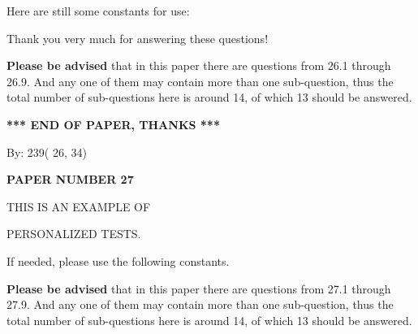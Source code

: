 \documentclass[12pt]{article}
\begin{document}
 
 
   
   
 \vspace{0.2in}
Here are still some constants for use:
 
 
 
 
Thank you very much for answering these questions!
 
{\textbf{\large{Please be advised}}} that in this paper there are questions from
26.1 through
26.9.
And any one of them may contain more than one sub-question, thus the total number
of sub-questions here is around 14, of which
13 should be answered.
 
   
   
   
   
\vspace{1.0in} 
{\textbf{\large{ *** END OF PAPER, THANKS *** }}} 
   
   
\hspace{1.0in} By: 
         239(         26,          34)
   
   
   
   
\newpage 
\setcounter{page}{ 
    27001 } 
   
   
   
   
 {\textbf{ \Large{ PAPER NUMBER          27 }}}
   
   
\vspace{0.2in}
   
   
   
   
   
   
 \vspace{0.2in}
 
 
{\Huge  THIS IS AN EXAMPLE OF}
 
{\Huge  PERSONALIZED TESTS. }
 
If needed, please use the following constants.
 
 
 
{\textbf{\large{Please be advised}}} that in this paper there are questions from
27.1 through
27.9.
And any one of them may contain more than one sub-question, thus the total number
of sub-questions here is around 14, of which
13 should be answered.
 
\vspace{0.3in}
 
 
   
   
  
\vspace{0.2in}
  
\end{document}
